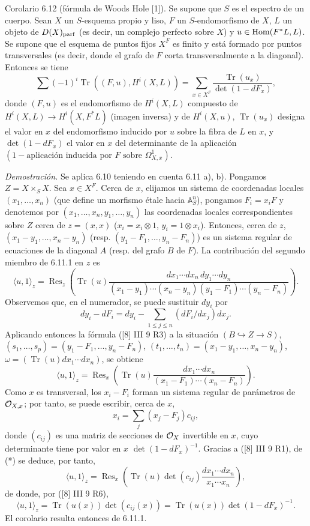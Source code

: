 \begin{statement}{Corolario 6.12}
(fórmula de Woods Hole [1]). Se supone que $S$ es el espectro de un cuerpo. Sean $X$ un $S$-esquema propio y liso, $F$ un $S$-endomorfismo de $X$, $L$ un objeto de $D(X)_{\mathrm{parf}}$ (es decir, un complejo perfecto sobre $X$) y $u\in\operatorname{Hom}(F^*L,L)$. Se supone que el esquema de puntos fijos $X^F$ es finito y está formado por puntos transversales (es decir, donde el grafo de $F$ corta transversalmente a la diagonal). Entonces se tiene
\[
\sum(-1)^i\operatorname{Tr}((F,u),H^i(X,L))=
\sum_{x\in X^F}\frac{\operatorname{Tr}(u_x)}{\det(1-dF_x)},
\]
donde $(F,u)$ es el endomorfismo de $H^i(X,L)$ compuesto de $H^i(X,L)\to H^i(X,F^*L)$ (imagen inversa) y de $H^i(X,u)$, $\operatorname{Tr}(u_x)$ designa el valor en $x$ del endomorfismo inducido por $u$ sobre la fibra de $L$ en $x$, y $\det(1-dF_x)$ el valor en $x$ del determinante de la aplicación $(1-\text{aplicación inducida por }F\text{ sobre }\Omega^1_{X,x})$.

\emph{Demostración.} Se aplica 6.10 teniendo en cuenta 6.11 a), b). Pongamos $Z=X\times_S X$. Sea $x\in X^F$. Cerca de $x$, elijamos un sistema de coordenadas locales $(x_1,\ldots,x_n)$ (que define un morfismo étale hacia $\mathbb A_S^n$), pongamos $F_i=x_iF$ y denotemos por $(x_1,\ldots,x_n,y_1,\ldots,y_n)$ las coordenadas locales correspondientes sobre $Z$ cerca de $z=(x,x)$ ($x_i=x_i\otimes1$, $y_i=1\otimes x_i$). Entonces, cerca de $z$, $(x_1-y_1,\ldots,x_n-y_n)$ (resp. $(y_1-F_1,\ldots,y_n-F_n)$) es un sistema regular de ecuaciones de la diagonal $A$ (resp. del grafo $B$ de $F$). La contribución del segundo miembro de 6.11.1 en $z$ es
\[
\langle u,1\rangle_z=
\operatorname{Res}_z\left(\operatorname{Tr}(u)\frac{dx_1\cdots dx_n\,dy_1\cdots dy_n}{(x_1-y_1)\cdots(x_n-y_n)(y_1-F_1)\cdots(y_n-F_n)}\right).
\]
Observemos que, en el numerador, se puede sustituir $dy_i$ por
\[
dy_i-dF_i=dy_i-\sum_{1\le j\le n}(dF_i/dx_j)dx_j.
\]
Aplicando entonces la fórmula ([8] III 9 R3) a la situación $(B\hookrightarrow Z\to S)$, $(s_1,\ldots,s_p)=(y_1-F_1,\ldots,y_n-F_n)$, $(t_1,\ldots,t_n)=(x_1-y_1,\ldots,x_n-y_n)$, $\omega=(\operatorname{Tr}(u)dx_1\cdots dx_n)$, se obtiene
\begin{equation}
\tag{*}
\langle u,1\rangle_z=
\operatorname{Res}_x\left(\operatorname{Tr}(u)\frac{dx_1\cdots dx_n}{(x_1-F_1)\cdots(x_n-F_n)}\right).
\end{equation}
Como $x$ es transversal, los $x_i-F_i$ forman un sistema regular de parámetros de $\mathcal{O}_{X,x}$; por tanto, se puede escribir, cerca de $x$,
\[
x_i=\sum_j(x_j-F_j)c_{ij},
\]
donde $(c_{ij})$ es una matriz de secciones de $\mathcal{O}_X$ invertible en $x$, cuyo determinante tiene por valor en $x$ $\det(1-dF_x)^{-1}$. Gracias a ([8] III 9 R1), de (*) se deduce, por tanto,
\[
\langle u,1\rangle_z=\operatorname{Res}_x\left(\operatorname{Tr}(u)\det(c_{ij})\frac{dx_1\cdots dx_n}{x_1\cdots x_n}\right),
\]
de donde, por ([8] III 9 R6),
\[
\langle u,1\rangle_z=\operatorname{Tr}(u(x))\det(c_{ij}(x))=\operatorname{Tr}(u(x))\det(1-dF_x)^{-1}.
\]
El corolario resulta entonces de 6.11.1.
\end{statement}


